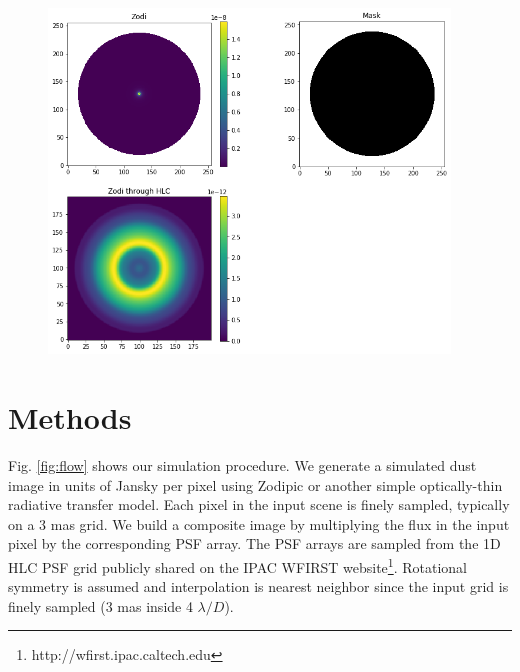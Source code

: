 \documentclass[]{spie}  %
\begin{document}
    \begin{figure}[htbp]

    \centering
    \includegraphics[width=0.95\textwidth]{Unknown-7.png}
    \caption{}
    \label{fig:gap}
\end{figure}


\section{Methods}
\label{sec:intro}  %
Fig. \ref{fig:flow} shows our simulation procedure. 
We generate a simulated dust image in units of Jansky per pixel using Zodipic\cite{kuchner_zodipic_2012} or another simple optically-thin radiative transfer model.
Each pixel in the input scene is finely sampled, typically on a 3 mas grid.  
We build a composite image by multiplying the flux in the input pixel by the corresponding PSF array.
The PSF arrays are sampled from the 1D \gls{HLC} \gls{PSF} grid publicly shared on the IPAC WFIRST  website\footnote{http://wfirst.ipac.caltech.edu}.
Rotational symmetry is assumed and interpolation is  nearest neighbor since the input grid is finely sampled (3 mas inside 4 $\lambda/D$).
\end{document}
